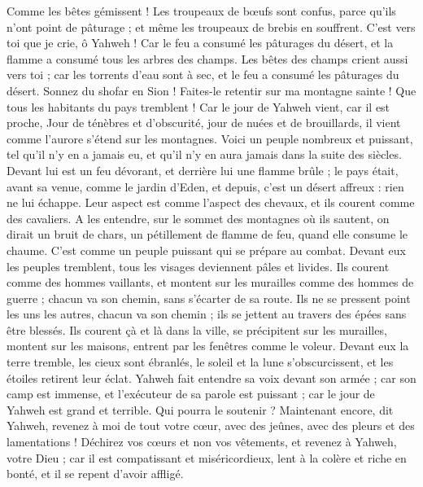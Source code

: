 \begin{multicols}{2}
Comme les bêtes gémissent ! Les troupeaux de bœufs sont confus, parce qu'ils n'ont point de pâturage ; et même les troupeaux de brebis en souffrent.
C’est vers toi que je crie, ô Yahweh ! Car le feu a consumé les pâturages du désert, et la flamme a consumé tous les arbres des champs.
Les bêtes des champs crient aussi vers toi ; car les torrents d’eau sont à sec, et le feu a consumé les pâturages du désert.
\VerseOne{}Sonnez du shofar en Sion ! Faites-le retentir sur ma montagne sainte ! Que tous les habitants du pays tremblent ! Car le jour de Yahweh vient, car il est proche,
Jour de ténèbres et d'obscurité, jour de nuées et de brouillards, il vient comme l'aurore s'étend sur les montagnes. Voici un peuple nombreux et puissant, tel qu’il n’y en a jamais eu, et qu’il n’y en aura jamais dans la suite des siècles.
Devant lui est un feu dévorant, et derrière lui une flamme brûle ; le pays était, avant sa venue, comme le jardin d’Eden, et depuis, c’est un désert affreux : rien ne lui échappe.
Leur aspect est comme l’aspect des chevaux, et ils courent comme des cavaliers.
A les entendre, sur le sommet des montagnes où ils sautent, on dirait un bruit de chars, un pétillement de flamme de feu, quand elle consume le chaume. C’est comme un peuple puissant qui se prépare au combat.
Devant eux les peuples tremblent, tous les visages deviennent pâles et livides.
Ils courent comme des hommes vaillants, et montent sur les murailles comme des hommes de guerre ; chacun va son chemin, sans s’écarter de sa route.
Ils ne se pressent point les uns les autres, chacun va son chemin ; ils se jettent au travers des épées sans être blessés.
Ils courent çà et là dans la ville, se précipitent sur les murailles, montent sur les maisons, entrent par les fenêtres comme le voleur.
Devant eux la terre tremble, les cieux sont ébranlés, le soleil et la lune s’obscurcissent, et les étoiles retirent leur éclat.
Yahweh fait entendre sa voix devant son armée ; car son camp est immense, et l'exécuteur de sa parole est puissant ; car le jour de Yahweh est grand et terrible. Qui pourra le soutenir ?
Maintenant encore, dit Yahweh, revenez à moi de tout votre cœur, avec des jeûnes, avec des pleurs et des lamentations !
Déchirez vos cœurs et non vos vêtements, et revenez à Yahweh, votre Dieu ; car il est compatissant et miséricordieux, lent à la colère et riche en bonté, et il se repent d’avoir affligé.

\end{multicols}
